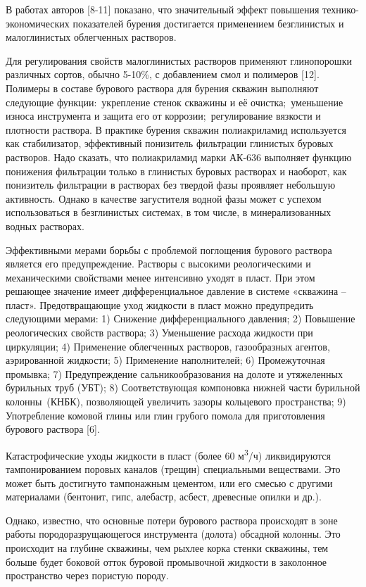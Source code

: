 В работах авторов {[}8-11{]} показано, что значительный эффект повышения
технико-экономических показателей бурения достигается применением
безглинистых и малоглинистых облегченных растворов.

Для регулирования свойств малоглинистых растворов применяют глинопорошки
различных сортов, обычно 5-10\%, с добавлением смол и полимеров
{[}12{]}. Полимеры в составе бурового раствора для бурения скважин
выполняют следующие функции:~укрепление стенок скважины и её
очистка;~уменьшение износа инструмента и защита его от
коррозии;~регулирование вязкости и плотности раствора. В практике
бурения скважин полиакриламид используется как стабилизатор, эффективный
понизитель фильтрации глинистых буровых растворов. Надо сказать, что
полиакриламид марки АК-636 выполняет функцию понижения фильтрации только
в глинистых буровых растворах и наоборот, как понизитель фильтрации в
растворах без твердой фазы проявляет небольшую активность. Однако в
качестве загустителя водной фазы может с успехом использоваться в
безглинистых системах, в том числе, в минерализованных водных растворах.

Эффективными мерами борьбы с проблемой поглощения бурового раствора
является его предупреждение. Растворы с высокими реологическими и
механическими свойствами менее интенсивно ухо­дят в пласт. При этом
решающее значение имеет дифференциаль­ное давление в системе «скважина --
пласт». Предотвращаю­щие уход жидкости в пласт можно предупредить
следующими мерами: 1) Снижение дифференциального давления; 2) Повышение
реологических свойств раствора; 3) Уменьшение расхода жидкости при
циркуляции; 4) Применение облегченных растворов, газообразных агентов,
аэрированной жидкости; 5) Применение наполнителей; 6) Промежуточная
промывка; 7) Предупреждение сальникообразования на долоте и утяжеленных
бурильных труб (УБТ)\textsc{;} 8) Соответствующая компоновка нижней
части бурильной колонны~(КНБК), позволяющей увели­чить зазоры кольцевого
пространства; 9) Употребление комовой глины или глин грубого помола для
приготовления бурового раствора {[}6{]}.

Катастрофические уходы жидкости в пласт (более 60
м\textsuperscript{3}/ч) ликвидируются тампонированием поровых каналов
(трещин) специальными веще­ствами. Это может быть достигнуто тампонажным
цементом, или его смесью с другими материалами (бентонит, гипс,
алебастр, асбест, древес­ные опилки и др.).

Однако, известно, что основные потери бурового раствора происходят в
зоне работы породоразрущающегося инструмента (долота) обсадной колонны.
Это происходит на глубине скважины, чем рыхлее корка стенки скважины,
тем больше будет боковой отток буровой промывочной жидкости в заколонное
пространство через пористую породу.

